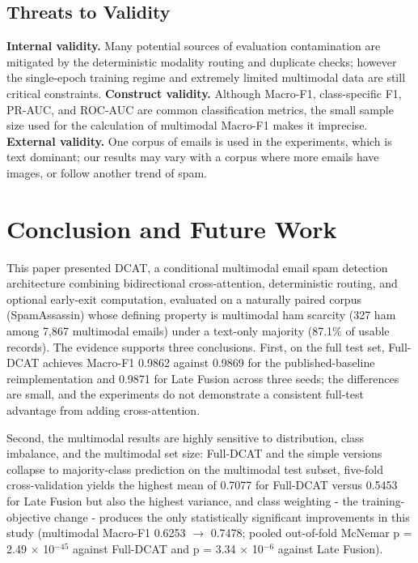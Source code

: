 \documentclass[10pt,twoside]{article}
\begin{document}
\subsection{Threats to Validity}\label{sec:9.4}

\textbf{Internal validity.} Many potential sources of evaluation contamination are mitigated by the deterministic modality routing and duplicate checks; however the single-epoch training regime and extremely limited multimodal data are still critical constraints. \textbf{Construct validity.} Although Macro-F1, class-specific F1, PR-AUC, and ROC-AUC are common classification metrics, the small sample size used for the calculation of multimodal Macro-F1 makes it imprecise. \textbf{External validity.} One corpus of emails is used in the experiments, which is text dominant; our results may vary with a corpus where more emails have images, or follow another trend of spam.

\section{Conclusion and Future Work}\label{sec:10}

This paper presented DCAT, a conditional multimodal email spam detection architecture combining bidirectional cross-attention, deterministic routing, and optional early-exit computation, evaluated on a naturally paired corpus (SpamAssassin) whose defining property is multimodal ham scarcity (327 ham among 7,867 multimodal emails) under a text-only majority (87.1\% of usable records). The evidence supports three conclusions. First, on the full test set, Full-DCAT achieves Macro-F1 0.9862 against 0.9869 for the published-baseline reimplementation and 0.9871 for Late Fusion across three seeds; the differences are small, and the experiments do not demonstrate a consistent full-test advantage from adding cross-attention.

Second, the multimodal results are highly sensitive to distribution, class imbalance, and the multimodal set size: Full-DCAT and the simple versions collapse to majority-class prediction on the multimodal test subset, five-fold cross-validation yields the highest mean of 0.7077 for Full-DCAT versus 0.5453 for Late Fusion but also the highest variance, and class weighting - the training-objective change - produces the only statistically significant improvements in this study (multimodal Macro-F1 0.6253 $\rightarrow$ 0.7478; pooled out-of-fold McNemar p = 2.49 $\times$ 10$^{-45}$ against Full-DCAT and p = 3.34 $\times$ 10$^{-6}$ against Late Fusion).
\end{document}
